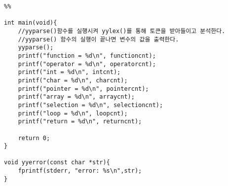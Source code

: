 \documentclass{article}
\begin{document}
\begin{verbatim}
%%

int main(void){
	//yyparse()함수를 실행시켜 yylex()를 통해 토큰을 받아들이고 분석한다.
	//yyparse() 함수의 실행이 끝나면 변수의 값을 출력한다.
	yyparse();
	printf("function = %d\n", functioncnt);
	printf("operator = %d\n", operatorcnt);
	printf("int = %d\n", intcnt);
	printf("char = %d\n", charcnt);
	printf("pointer = %d\n", pointercnt);
	printf("array = %d\n", arraycnt);
	printf("selection = %d\n", selectioncnt);
	printf("loop = %d\n", loopcnt);
	printf("return = %d\n", returncnt);

	return 0;
}

void yyerror(const char *str){
	fprintf(stderr, "error: %s\n",str);
}
\end{verbatim}
\end{document}
